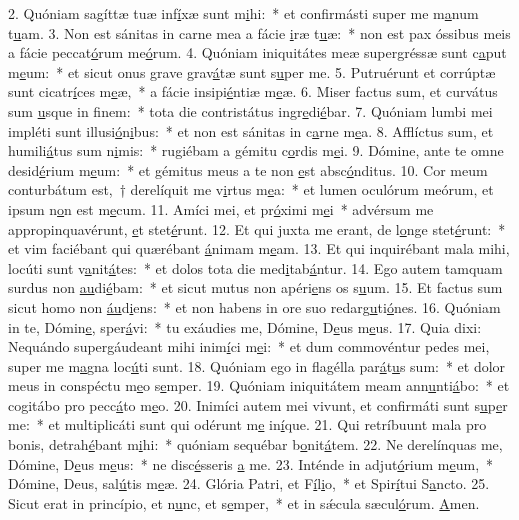 2. Quóniam sagíttæ tuæ inf\uline{í}xæ sunt m\uline{i}hi:~* et confirmásti super me m\uline{a}num t\uline{u}am.
3. Non est sánitas in carne mea a fácie \uline{i}ræ t\uline{u}æ:~* non est pax óssibus meis a fácie peccat\uline{ó}rum me\uline{ó}rum.
4. Quóniam iniquitátes meæ supergréssæ sunt c\uline{a}put m\uline{e}um:~* et sicut onus grave grav\uline{á}tæ sunt s\uline{u}per me.
5. Putruérunt et corrúptæ sunt cicatr\uline{í}ces m\uline{e}æ,~* a fácie insipi\uline{é}ntiæ m\uline{e}æ.
6. Miser factus sum, et curvátus sum \uline{u}sque in f\uline{i}nem:~* tota die contristátus ingr\uline{e}di\uline{é}bar.
7. Quóniam lumbi mei impléti sunt illusi\uline{ó}n\uline{i}bus:~* et non est sánitas in c\uline{a}rne m\uline{e}a.
8. Afflíctus sum, et humili\uline{á}tus sum n\uline{i}mis:~* rugiébam a gémitu c\uline{o}rdis m\uline{e}i.
9. Dómine, ante te omne desid\uline{é}rium m\uline{e}um:~* et gémitus meus a te non \uline{e}st absc\uline{ó}nditus.
10. Cor meum conturbátum est,~† derelíquit me v\uline{i}rtus m\uline{e}a:~* et lumen oculórum meórum, et ipsum n\uline{o}n est m\uline{e}cum.
11. Amíci mei, et pr\uline{ó}ximi m\uline{e}i~* advérsum me appropinquavérunt, \uline{e}t stet\uline{é}runt.
12. Et qui juxta me erant, de l\uline{o}nge stet\uline{é}runt:~* et vim faciébant qui quærébant \uline{á}nimam m\uline{e}am.
13. Et qui inquirébant mala mihi, locúti sunt v\uline{a}nit\uline{á}tes:~* et dolos tota die med\uline{i}tab\uline{á}ntur.
14. Ego autem tamquam surdus non \uline{au}di\uline{é}bam:~* et sicut mutus non apéri\uline{e}ns os s\uline{u}um.
15. Et factus sum sicut homo non \uline{áu}d\uline{i}ens:~* et non habens in ore suo redarg\uline{u}ti\uline{ó}nes.
16. Quóniam in te, Dómin\uline{e}, sper\uline{á}vi:~* tu exáudies me, Dómine, D\uline{e}us m\uline{e}us.
17. Quia dixi: Nequándo supergáudeant mihi inim\uline{í}ci m\uline{e}i:~* et dum commovéntur pedes mei, super me m\uline{a}gna loc\uline{ú}ti sunt.
18. Quóniam ego in flagélla par\uline{á}t\uline{u}s sum:~* et dolor meus in conspéctu m\uline{e}o s\uline{e}mper.
19. Quóniam iniquitátem meam ann\uline{u}nti\uline{á}bo:~* et cogitábo pro pecc\uline{á}to m\uline{e}o.
20. Inimíci autem mei vivunt, et confirmáti sunt s\uline{u}p\uline{e}r me:~* et multiplicáti sunt qui odérunt m\uline{e} in\uline{í}que.
21. Qui retríbuunt mala pro bonis, detrah\uline{é}bant m\uline{i}hi:~* quóniam sequébar b\uline{o}nit\uline{á}tem.
22. Ne derelínquas me, Dómine, D\uline{e}us m\uline{e}us:~* ne disc\uline{é}sseris \uline{a} me.
23. Inténde in adjut\uline{ó}rium m\uline{e}um,~* Dómine, Deus, sal\uline{ú}tis m\uline{e}æ.
24. Glória Patri, et F\uline{í}l\uline{i}o,~* et Spir\uline{í}tui S\uline{a}ncto.
25. Sicut erat in princípio, et n\uline{u}nc, et s\uline{e}mper,~* et in sǽcula sæcul\uline{ó}rum. \uline{A}men.

